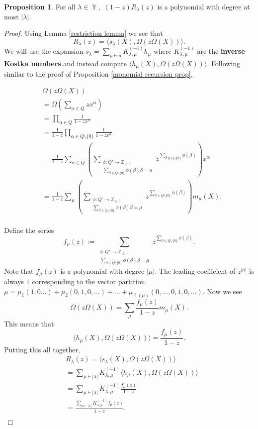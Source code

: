 \documentclass[12pt,reqno]{amsart}
\theoremstyle{definition}
\newtheorem{prop}[thm]{Proposition}
\DeclareMathOperator{\Par}{\mathbb{Y}}
\begin{document}
\begin{prop}
    For all $\lambda \in \Par,$
     $(1-z)R_{\lambda}(z)$ is a polynomial with degree at most $|\lambda|$. 
\end{prop}
\begin{proof}
Using Lemma \ref{restriction lemma} we see that 
$$R_{\lambda}(z) = \langle s_{\lambda}(X), \Omega\left(z \Omega(X) \right) \rangle.$$ We will use the expansion $s_{\lambda} = \sum_{\mu \vdash n} K^{(-1)}_{\lambda,\mu} h_{\mu}$ where $K^{(-1)}_{\lambda,\mu}$ are the \textbf{inverse Kostka numbers} and instead compute $\langle h_{\mu}(X), \Omega\left(z \Omega(X) \right) \rangle$. Following similar to the proof of Proposition \ref{monomial recursion prop}, 

\begin{align*}
    &\Omega\left(z\Omega(X) \right) \\
    &= \Omega\left( \sum_{\alpha \in Q} zx^{\alpha} \right)\\
    &= \prod_{\alpha \in Q} \frac{1}{1-zx^{\alpha}}\\
    &= \frac{1}{1-z}\prod_{\alpha \in Q\setminus \{0\}} \frac{1}{1-zx^{\alpha}}\\
    &= \frac{1}{1-z} \sum_{\alpha \in Q} \left( \sum_{\substack{\phi:Q'\rightarrow \mathbb{Z}_{\geq 0} \\ \sum_{\beta \in Q\setminus \{0\}} \phi(\beta)\beta = \alpha } } z^{\sum_{\beta \in Q\setminus \{0\}}\phi(\beta)}  \right) x^{\alpha }\\
    &= \frac{1}{1-z} \sum_{\mu} \left( \sum_{\substack{\phi:Q'\rightarrow \mathbb{Z}_{\geq 0} \\ \sum_{\beta \in Q\setminus \{0\}} \phi(\beta)\beta = \mu } } z^{\sum_{\beta \in Q\setminus \{0\}}\phi(\beta)}  \right) m_{\mu}(X).\\
\end{align*}

Define the series
$$f_{\mu}(z):= \sum_{\substack{\phi:Q'\rightarrow \mathbb{Z}_{\geq 0} \\ \sum_{\beta \in Q\setminus \{0\}} \phi(\beta)\beta = \mu } } z^{\sum_{\beta \in Q\setminus \{0\}}\phi(\beta)}.$$ Note that $f_{\mu}(z)$ is a polynomial with degree $|\mu|.$ The leading coefficient of $z^{|\mu|}$ is always $1$ corresponding to the vector partition $\mu= \mu_1(1,0\ldots) + \mu_2 (0,1,0,\ldots) + \ldots + \mu_{\ell(\mu)}(0,\ldots,0,1,0,\ldots)$. Now we see 
$$\Omega\left(z\Omega(X) \right) = \sum_{\mu} \frac{f_{\mu}(z)}{1-z} m_{\mu}(X).$$ This means that 
$$\langle h_{\mu}(X), \Omega\left(z\Omega(X) \right) \rangle = \frac{f_{\mu}(z)}{1-z}.$$ Putting this all together, 
\begin{align*}
    &R_{\lambda}(z) = \langle s_{\lambda}(X), \Omega\left(z \Omega(X) \right) \rangle\\
    &= \sum_{\mu\vdash |\lambda|} K^{(-1)}_{\lambda,\mu} \langle h_{\mu}(X), \Omega\left(z \Omega(X) \right) \rangle\\
    &= \sum_{\mu\vdash |\lambda|} K^{(-1)}_{\lambda,\mu} \frac{f_{\mu}(z)}{1-z}\\
    &= \frac{\sum_{\mu\vdash |\lambda|} K^{(-1)}_{\lambda,\mu} f_{\mu}(z)}{1-z}.\\
\end{align*}


\end{proof}
\end{document}
